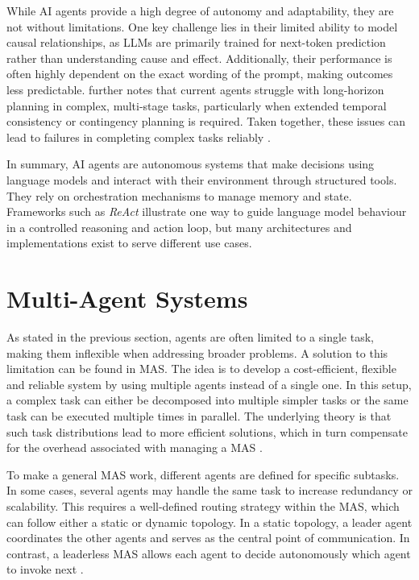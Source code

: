 \documentclass[a4paper,oneside,bibliography=totoc]{scrbook}
\begin{document}
While \ac{AI} agents provide a high degree of autonomy and adaptability, they are not without limitations. One key challenge lies in their limited ability to model causal relationships, as \acp{LLM} are primarily trained for next-token prediction rather than understanding cause and effect. Additionally, their performance is often highly dependent on the exact wording of the prompt, making outcomes less predictable. \citet{Sapkota2025} further notes that current agents struggle with long-horizon planning in complex, multi-stage tasks, particularly when extended temporal consistency or contingency planning is required. Taken together, these issues can lead to failures in completing complex tasks reliably \cite{Sapkota2025}.


In summary, \ac{AI} agents are autonomous systems that make decisions using language models and interact with their environment through structured tools. They rely on orchestration mechanisms to manage memory and state. Frameworks such as \textit{\ac{ReAct}} illustrate one way to guide language model behaviour in a controlled reasoning and action loop, but many architectures and implementations exist to serve different use cases.

\section{Multi-Agent Systems}
\label{sec:multi_agent_systems}

As stated in the previous section, agents are often limited to a single task, making them inflexible when addressing broader problems. A solution to this limitation can be found in \ac{MAS}. The idea is to develop a cost-efficient, flexible and reliable system by using multiple agents instead of a single one. In this setup, a complex task can either be decomposed into multiple simpler tasks or the same task can be executed multiple times in parallel. The underlying theory is that such task distributions lead to more efficient solutions, which in turn compensate for the overhead associated with managing a \ac{MAS} \cite{Dorri2018}.

To make a general \ac{MAS} work, different agents are defined for specific subtasks. In some cases, several agents may handle the same task to increase redundancy or scalability. This requires a well-defined routing strategy within the \ac{MAS}, which can follow either a static or dynamic topology. In a static topology, a leader agent coordinates the other agents and serves as the central point of communication. In contrast, a leaderless \ac{MAS} allows each agent to decide autonomously which agent to invoke next \cite{Dorri2018}. \pagebreak[4]
\end{document}
